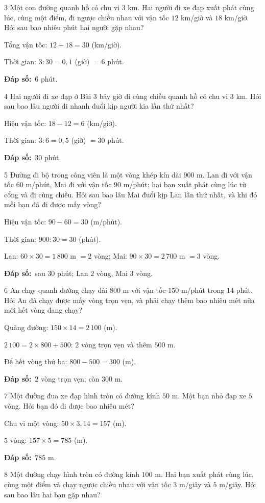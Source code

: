 \documentclass[11pt]{article}
\newif\ifsol \solfalse
\providecommand{\AnsWord}{Đáp số}
\newcommand{\dapso}[1]{\par\textbf{\AnsWord:}\ #1}
\newcommand{\probsol}[1]{%
  \begin{lrbox}{\solmeasure}\begin{minipage}{\dimexpr\linewidth-24pt\relax}#1\end{minipage}\end{lrbox}%
  \ifsol
    \begin{solbox}#1\end{solbox}%
  \else
    \setlength{\solht}{\dimexpr\ht\solmeasure+\dp\solmeasure+0.85cm\relax}%
    \ifdim\solht<1.35cm\setlength{\solht}{1.35cm}\fi
    \begin{tcolorbox}[colback=white,colframe=Line,boxrule=0.8pt,arc=5pt,
      left=8pt,right=8pt,top=4pt,bottom=4pt,height=\solht]{\footnotesize\color{Slate}\itshape\WorkWord}\end{tcolorbox}%
  \fi}
\newcommand{\gap}{\vspace{0.3cm}}
\def\WorkWord{Bài làm:}
\def\AnsWord{Đáp số}
\begin{document}
\gap
\begin{probbox}{3}{\relax}
Một con đường quanh hồ có chu vi $3$ km. Hai người đi xe đạp xuất phát cùng lúc, cùng một điểm, đi ngược chiều nhau với vận tốc $12$ km/giờ và $18$ km/giờ. Hỏi sau bao nhiêu phút hai người gặp nhau?
\end{probbox}
\probsol{
Tổng vận tốc: $12+18=30$ (km/giờ).\par Thời gian: $3:30=0{,}1$ (giờ) $=6$ phút.
\dapso{$6$ phút.}}
\gap
\begin{probbox}{4}{\relax}
Hai người đi xe đạp ở Bài 3 bây giờ đi cùng chiều quanh hồ có chu vi $3$ km. Hỏi sau bao lâu người đi nhanh đuổi kịp người kia lần thứ nhất?
\end{probbox}
\probsol{
Hiệu vận tốc: $18-12=6$ (km/giờ).\par Thời gian: $3:6=0{,}5$ (giờ) $=30$ phút.
\dapso{$30$ phút.}}
\gap
\begin{probbox}{5}{\relax}
Đường đi bộ trong công viên là một vòng khép kín dài $900$ m. Lan đi với vận tốc $60$ m/phút, Mai đi với vận tốc $90$ m/phút; hai bạn xuất phát cùng lúc từ cổng và đi cùng chiều. Hỏi sau bao lâu Mai đuổi kịp Lan lần thứ nhất, và khi đó mỗi bạn đã đi được mấy vòng?
\end{probbox}
\probsol{
Hiệu vận tốc: $90-60=30$ (m/phút).\par Thời gian: $900:30=30$ (phút).\par
Lan: $60\times30=1\,800$ m $=2$ vòng; Mai: $90\times30=2\,700$ m $=3$ vòng.
\dapso{sau $30$ phút; Lan $2$ vòng, Mai $3$ vòng.}}
\gap
\begin{probbox}{6}{\relax}
An chạy quanh đường chạy dài $800$ m với vận tốc $150$ m/phút trong $14$ phút. Hỏi An đã chạy được mấy vòng trọn vẹn, và phải chạy thêm bao nhiêu mét nữa mới hết vòng đang chạy?
\end{probbox}
\probsol{
Quãng đường: $150\times14=2\,100$ (m).\par $2\,100=2\times800+500$: $2$ vòng trọn vẹn và thêm $500$ m.\par
Để hết vòng thứ ba: $800-500=300$ (m).
\dapso{$2$ vòng trọn vẹn; còn $300$ m.}}
\gap
\begin{probbox}{7}{\relax}
Một đường đua xe đạp hình tròn có đường kính $50$ m. Một bạn nhỏ đạp xe $5$ vòng. Hỏi bạn đó đi được bao nhiêu mét?
\end{probbox}
\probsol{
Chu vi một vòng: $50\times3{,}14=157$ (m).\par $5$ vòng: $157\times5=785$ (m).
\dapso{$785$ m.}}
\gap
\begin{probbox}{8}{\relax}
Một đường chạy hình tròn có đường kính $100$ m. Hai bạn xuất phát cùng lúc, cùng một điểm và chạy ngược chiều nhau với vận tốc $3$ m/giây và $5$ m/giây. Hỏi sau bao lâu hai bạn gặp nhau?
\end{probbox}
\end{document}
